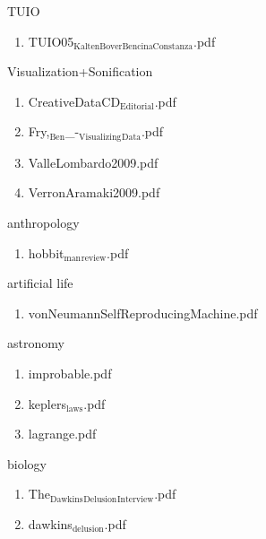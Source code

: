 \documentclass[11pt]{article}
\begin{document}
\item TUIO
\label{sec-1-1-1-1-11-13}
\begin{enumerate}
\item TUIO05$_{\text{KaltenBoverBencinaConstanza}}$.pdf
\label{sec-1-1-1-1-11-13-1}
\end{enumerate}

\item Visualization+Sonification
\label{sec-1-1-1-1-11-14}
\begin{enumerate}
\item CreativeDataCD$_{\text{Editorial}}$.pdf
\label{sec-1-1-1-1-11-14-1}

\item Fry,$_{\text{Ben}}$\_-$_{\text{Visualizing}}$$_{\text{Data}}$.pdf
\label{sec-1-1-1-1-11-14-2}

\item ValleLombardo2009.pdf
\label{sec-1-1-1-1-11-14-3}

\item VerronAramaki2009.pdf
\label{sec-1-1-1-1-11-14-4}
\end{enumerate}

\item anthropology
\label{sec-1-1-1-1-11-15}
\begin{enumerate}
\item hobbit$_{\text{man}}$$_{\text{review}}$.pdf
\label{sec-1-1-1-1-11-15-1}
\end{enumerate}

\item artificial life
\label{sec-1-1-1-1-11-16}
\begin{enumerate}
\item vonNeumannSelfReproducingMachine.pdf
\label{sec-1-1-1-1-11-16-1}
\end{enumerate}

\item astronomy
\label{sec-1-1-1-1-11-17}
\begin{enumerate}
\item improbable.pdf
\label{sec-1-1-1-1-11-17-1}

\item keplers$_{\text{laws}}$.pdf
\label{sec-1-1-1-1-11-17-2}

\item lagrange.pdf
\label{sec-1-1-1-1-11-17-3}
\end{enumerate}

\item biology
\label{sec-1-1-1-1-11-18}
\begin{enumerate}
\item The$_{\text{Dawkins}}$$_{\text{Delusion}}$$_{\text{Interview}}$.pdf
\label{sec-1-1-1-1-11-18-1}

\item dawkins$_{\text{delusion}}$.pdf
\label{sec-1-1-1-1-11-18-2}
\end{enumerate}
\end{document}
